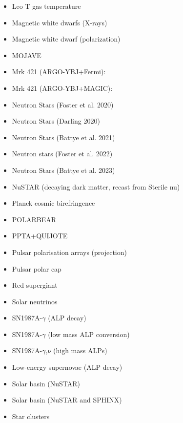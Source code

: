 \documentclass[8pt,twocolumn]{extarticle}
\begin{document}
\begin{mdframed}[everyline=true]
\begin{itemize}
    \item Leo T gas temperature~\cite{Wadekar:2021qae}
    \item Magnetic white dwarfs (X-rays)~\cite{Dessert:2021bkv}
    \item Magnetic white dwarf (polarization)~\cite{Dessert:2022yqq}
    \item MOJAVE~\cite{Ivanov:2018byi}
    \item Mrk 421 (ARGO-YBJ+Fermi):~\cite{Li:2020pcn}
    \item Mrk 421 (ARGO-YBJ+MAGIC):~\cite{Li:2021gxs}
    \item Neutron Stars (Foster et al. 2020)~\cite{Foster:2020pgt}
    \item Neutron Stars (Darling 2020)~\cite{Darling:2020uyo}
    \item Neutron Stars (Battye et al. 2021)~\cite{Battye:2021yue}
    \item Neutron stars (Foster et al. 2022)~\cite{Foster:2022fxn}
    \item Neutron Stars (Battye et al. 2023)~\cite{Battye:2023oac}
    \item NuSTAR (decaying dark matter, recast from Sterile nu)~\cite{Perez:2016tcq,Ng:2019gch,Roach:2022lgo}
   	\item Planck cosmic birefringence~\cite{Fedderke:2019ajk}
   	\item POLARBEAR~\cite{POLARBEAR:2023ric}
    \item PPTA+QUIJOTE~\cite{Castillo:2022zfl}
    \item Pulsar polarisation arrays (projection)~\cite{Liu:2021zlt}
    \item Pulsar polar cap~\cite{Noordhuis:2022ljw}
    \item Red supergiant~\cite{Severino:2022nue}
    \item Solar neutrinos~\cite{Vinyoles2015}
    \item SN1987A-$\gamma$ (ALP decay)~\cite{Jaeckel:2017tud,Hoof:2022xbe,Muller:2023vjm}
    \item SN1987A-$\gamma$ (low mass ALP conversion)~\cite{Payez:2014xsa,Hoof:2022xbe}
    \item SN1987A-$\gamma$,$\nu$ (high mass ALPs)~\cite{Lucente:2020whw,Caputo:2021rux}
    \item Low-energy supernovae (ALP decay)~\cite{Caputo:2022mah}
    \item Solar basin (NuSTAR)~\cite{DeRocco:2022jyq}
    \item Solar basin (NuSTAR and SPHINX)~\cite{Beaufort:2023zuj}
    \item Star clusters~\cite{Dessert:2020lil}

\end{itemize}
\end{mdframed}
\end{document}
